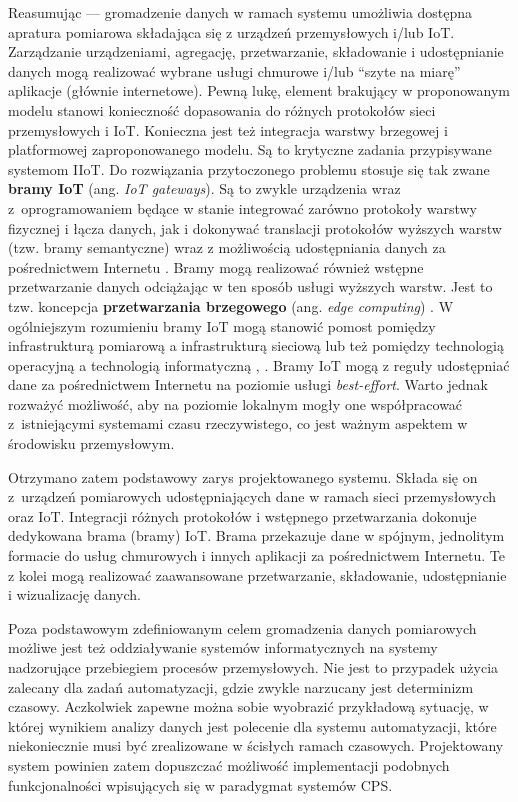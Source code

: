 \documentclass[a4paper, 12pt, twoside]{article}
\begin{document}
Reasumując --- gromadzenie danych w ramach systemu umożliwia dostępna apratura pomiarowa
składająca się z urządzeń przemysłowych i/lub IoT. Zarządzanie urządzeniami, agregację, przetwarzanie, składowanie i udostępnianie
danych mogą realizować wybrane usługi chmurowe i/lub ``szyte na miarę'' aplikacje (głównie internetowe).
Pewną lukę, element brakujący w proponowanym modelu stanowi konieczność dopasowania
do różnych protokołów sieci przemysłowych i IoT. Konieczna jest też integracja
warstwy brzegowej i platformowej zaproponowanego modelu. Są to krytyczne zadania
przypisywane systemom IIoT. Do rozwiązania 
przytoczonego problemu stosuje się tak zwane \textbf{bramy IoT} (ang. \emph{IoT gateways}). Są to zwykle
urządzenia wraz z~oprogramowaniem będące w stanie integrować zarówno protokoły
warstwy fizycznej i łącza danych, jak i dokonywać translacji protokołów wyższych warstw 
(tzw. bramy semantyczne) wraz z możliwością udostępniania danych za pośrednictwem
Internetu \cite{iiot-heterogenous-gateways}. Bramy mogą realizować również
wstępne przetwarzanie danych odciążając w ten sposób usługi wyższych warstw.
Jest to tzw. koncepcja \textbf{przetwarzania brzegowego} (ang. \emph{edge computing}) \cite{iot-gateway-medical-and-industrial}.
W ogólniejszym rozumieniu bramy IoT mogą stanowić pomost pomiędzy infrastrukturą
pomiarową a infrastrukturą sieciową lub też pomiędzy technologią operacyjną a 
technologią informatyczną \cite{iiot-gateway-introduction}, \cite{iiot-challenges-opportunities-directions}. 
Bramy IoT mogą z reguły udostępniać dane za pośrednictwem Internetu na poziomie usługi \emph{best-effort}.
Warto jednak rozważyć możliwość, aby na poziomie lokalnym mogły one współpracować z~istniejącymi
systemami czasu rzeczywistego, co jest ważnym aspektem w środowisku przemysłowym. 

Otrzymano zatem podstawowy zarys projektowanego systemu.
Składa się on z~urządzeń pomiarowych udostępniających dane w ramach sieci 
przemysłowych oraz IoT. Integracji różnych protokołów i wstępnego przetwarzania
dokonuje dedykowana brama (bramy) IoT. Brama przekazuje dane w spójnym, jednolitym
formacie do usług chmurowych i innych aplikacji za pośrednictwem Internetu.
Te z kolei mogą realizować zaawansowane przetwarzanie, składowanie, udostępnianie
i wizualizację danych. 

Poza podstawowym zdefiniowanym celem gromadzenia danych pomiarowych
możliwe jest też oddziaływanie systemów informatycznych na systemy nadzorujące 
przebiegiem procesów przemysłowych. Nie jest to przypadek użycia
zalecany dla zadań automatyzacji, gdzie zwykle narzucany jest determinizm czasowy. 
Aczkolwiek zapewne można sobie wyobrazić przykładową sytuację, w której wynikiem analizy danych jest 
polecenie dla systemu automatyzacji, które niekoniecznie musi
być zrealizowane w ścisłych ramach czasowych. Projektowany system powinien zatem dopuszczać
możliwość implementacji podobnych funkcjonalności wpisujących się w paradygmat
systemów CPS. 
\end{document}

